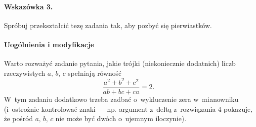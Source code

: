 \paragraph{Wskazówka 3.} Spróbuj przekształcić tezę zadania tak, aby pozbyć się pierwiastków.

\paragraph{Uogólnienia i modyfikacje} Warto rozważyć zadanie pytania, jakie trójki (niekoniecznie dodatnich) liczb rzeczywistych $a$, $b$, $c$ spełniają równość
\[\frac{a^2+b^2+c^2}{ab+bc+ca}=2.\]
W~tym zadaniu dodatkowo trzeba zadbać o~wykluczenie zera w~mianowniku (i~ostrożnie kontrolować znaki --- np. argument z~deltą z~rozwiązania 4 pokazuje, że pośród $a$, $b$, $c$ nie może być dwóch o~ujemnym iloczynie).